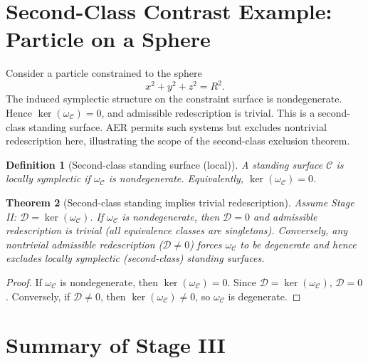 \documentclass[11pt]{article}
\newtheorem{definition}{Definition}[section]
\newtheorem{theorem}[definition]{Theorem}
\theoremstyle{remark}
\theoremstyle{plain}
\begin{document}
\section{Second-Class Contrast Example: Particle on a Sphere}

Consider a particle constrained to the sphere
\begin{equation}
x^2 + y^2 + z^2 = R^2.
\end{equation}
The induced symplectic structure on the constraint surface is nondegenerate.
Hence $\ker(\omega_{\mathcal{C}})=0$,
and admissible redescription is trivial.
This is a second-class standing surface.
AER permits such systems but excludes nontrivial redescription here,
illustrating the scope of the second-class exclusion theorem.



\begin{definition}[Second-class standing surface (local)]
A standing surface $\mathcal{C}$ is locally \emph{symplectic} if $\omega_{\mathcal{C}}$ is nondegenerate.
Equivalently, $\ker(\omega_{\mathcal{C}})=0$.
\end{definition}

\begin{theorem}[Second-class standing implies trivial redescription]
\label{thm:secondclass}
Assume Stage II: $\mathcal{D}=\ker(\omega_{\mathcal{C}})$.
If $\omega_{\mathcal{C}}$ is nondegenerate, then $\mathcal{D}=0$ and admissible redescription is trivial (all equivalence classes are singletons).
Conversely, any nontrivial admissible redescription ($\mathcal{D}\neq 0$) forces $\omega_{\mathcal{C}}$ to be degenerate and hence excludes locally symplectic (second-class) standing surfaces.
\end{theorem}

\begin{proof}
If $\omega_{\mathcal{C}}$ is nondegenerate, then $\ker(\omega_{\mathcal{C}})=0$. Since $\mathcal{D}=\ker(\omega_{\mathcal{C}})$, $\mathcal{D}=0$.
Conversely, if $\mathcal{D}\neq 0$, then $\ker(\omega_{\mathcal{C}})\neq 0$, so $\omega_{\mathcal{C}}$ is degenerate.
\end{proof}

\section{Summary of Stage III}
\end{document}

